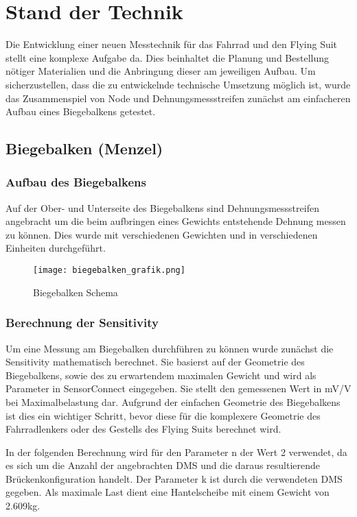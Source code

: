 \chapter{Stand der Technik}
Die Entwicklung einer neuen Messtechnik für das Fahrrad und den Flying Suit stellt eine komplexe Aufgabe da.
Dies beinhaltet die Planung und Bestellung nötiger Materialien und die Anbringung dieser am jeweiligen Aufbau.
Um sicherzustellen, dass die zu entwickelnde technische Umsetzung möglich ist, wurde das Zusammenspiel von Node und Dehnungsmessstreifen zunächst am einfacheren Aufbau eines Biegebalkens getestet.


\section{Biegebalken (Menzel)}
\subsection{Aufbau des Biegebalkens}
Auf der Ober- und Unterseite des Biegebalkens sind Dehnungsmessstreifen angebracht um die beim aufbringen eines Gewichts entstehende Dehnung messen zu können.
Dies wurde mit verschiedenen Gewichten und in verschiedenen Einheiten durchgeführt.
\begin{figure}[h]
    \begin{center}
        \texttt{[image: biegebalken\_grafik.png]}
        \caption[Biegebalken Schema (Abbildungsverzeichnis)]{Biegebalken Schema
        }
        \label{fig:biegebalkenschema}
    \end{center}
\end{figure}
\subsection{Berechnung der Sensitivity}
Um eine Messung am Biegebalken durchführen zu können wurde zunächst die Sensitivity mathematisch berechnet.
Sie basierst auf der Geometrie des Biegebalkens, sowie des zu erwartendem maximalen Gewicht und wird als Parameter in SensorConnect eingegeben.
Sie stellt den gemessenen Wert in mV/V bei Maximalbelastung dar.
Aufgrund der einfachen Geometrie des Biegebalkens ist dies ein wichtiger Schritt, bevor diese für die komplexere Geometrie des Fahrradlenkers oder des Gestells des Flying Suits berechnet wird.

In der folgenden Berechnung wird für den Parameter n der Wert 2 verwendet, da es sich um die Anzahl der angebrachten DMS und die daraus resultierende Brückenkonfiguration handelt.
Der Parameter k ist durch die verwendeten DMS gegeben. Als maximale Last dient eine Hantelscheibe mit einem Gewicht von 2.609kg.

